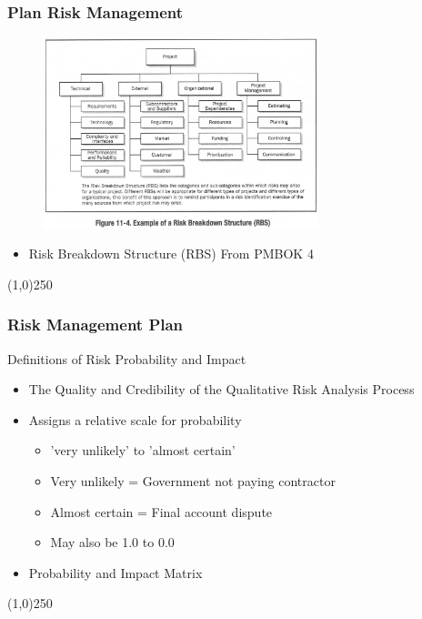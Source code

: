 \begin{frame}
\frametitle{Plan Risk Management}
\begin{figure}
	\centering
		\includegraphics[width = 8cm]{images/RBS.jpg}
	\label{fig:11-4OLD}
\end{figure}
\begin{itemize}
\item Risk Breakdown Structure (RBS) From PMBOK 4
\end{itemize}
\end{frame}\begin{center}\line(1,0){250}\end{center}






\begin{frame}
\frametitle{Risk Management Plan}
Definitions of Risk Probability and Impact
\begin{itemize}
	\item The Quality and Credibility of the Qualitative Risk Analysis Process
	\item Assigns a relative scale for probability

	\begin{itemize}
		\item 'very unlikely' to 'almost certain'
		\item Very unlikely = Government not paying contractor
		\item Almost certain = Final account dispute
		\item May also be 1.0 to 0.0
	\end{itemize}
	\item Probability and Impact Matrix
\end{itemize}
\end{frame}\begin{center}\line(1,0){250}\end{center}






